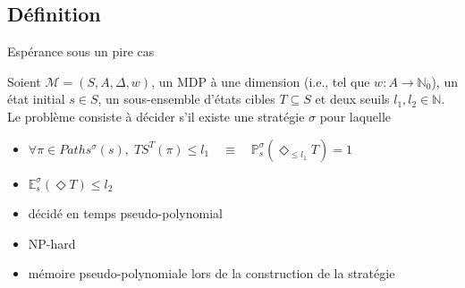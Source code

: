 \documentclass[compress]{beamer}
\theoremstyle{theorem}%
\begin{document}
\subsection{Définition}
\begin{frame}{Espérance sous un pire cas}
  \small
  \begin{definition}[SSP-WE]
    Soient $\mathcal{M}=(S, A, \Delta, w)$, un MDP à une dimension (i.e., tel que $w : A \rightarrow \mathbb{N}_0$), un état initial $s \in S$, un sous-ensemble d'états cibles $T \subseteq S$ et deux seuils $l_1, l_2 \in \mathbb{N}$.
    Le problème consiste à décider s'il existe une stratégie $\sigma$ pour laquelle
    \begin{itemize}
      \item $\forall \pi \in Paths^\sigma(s), \; TS^T(\pi) \leq l_1 \quad
        \equiv \quad \mathbb{P}^\sigma_s(\Diamond_{\leq l_1} T) = 1$
      \item $\mathbb{E}_s^\sigma(\Diamond T) \leq l_2$
    \end{itemize}
  \end{definition}
  \begin{itemize}
    \item décidé en temps {\color{fibeamer@orange}pseudo-polynomial}
    \item NP-hard
    \item mémoire pseudo-polynomiale lors de la construction de la stratégie
  \end{itemize}
\end{frame}
\end{document}
